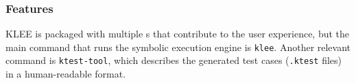 






\subsubsection{Features}

KLEE is packaged with multiple s that contribute to the user experience, but the main command that runs the symbolic execution engine is \lstinline{klee}. Another relevant command is \lstinline$ktest-tool$, which describes the generated test cases (\lstinline$.ktest$ files) in a human-readable format.

